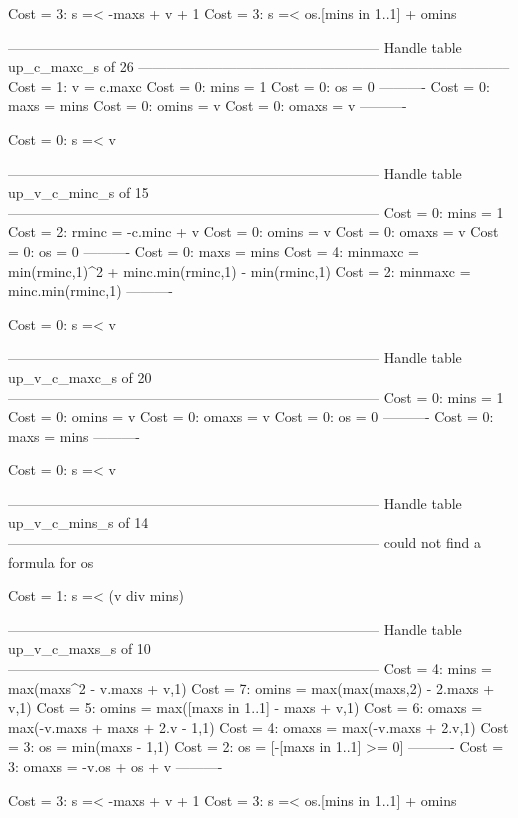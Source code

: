 Cost =  3:  s =< -maxs + v + 1
Cost =  3:  s =< os.[mins in 1..1] + omins

--------------------------------------------------------------------------------
Handle table up_c_maxc_s of 26
--------------------------------------------------------------------------------
Cost =  1:  v     = c.maxc
Cost =  0:  mins  = 1
Cost =  0:  os    = 0
----------
Cost =  0:  maxs  = mins
Cost =  0:  omins = v
Cost =  0:  omaxs = v
----------

Cost =  0:  s =< v

--------------------------------------------------------------------------------
Handle table up_v_c_minc_s of 15
--------------------------------------------------------------------------------
Cost =  0:  mins    = 1
Cost =  2:  rminc   = -c.minc + v
Cost =  0:  omins   = v
Cost =  0:  omaxs   = v
Cost =  0:  os      = 0
----------
Cost =  0:  maxs    = mins
Cost =  4:  minmaxc = min(rminc,1)^2 + minc.min(rminc,1) - min(rminc,1)
Cost =  2:  minmaxc = minc.min(rminc,1)
----------

Cost =  0:  s =< v

--------------------------------------------------------------------------------
Handle table up_v_c_maxc_s of 20
--------------------------------------------------------------------------------
Cost =  0:  mins  = 1
Cost =  0:  omins = v
Cost =  0:  omaxs = v
Cost =  0:  os    = 0
----------
Cost =  0:  maxs  = mins
----------

Cost =  0:  s =< v

--------------------------------------------------------------------------------
Handle table up_v_c_mins_s of 14
--------------------------------------------------------------------------------
could not find a formula for os

Cost =  1:  s =< (v div mins)

--------------------------------------------------------------------------------
Handle table up_v_c_maxs_s of 10
--------------------------------------------------------------------------------
Cost =  4:  mins  = max(maxs^2 - v.maxs + v,1)
Cost =  7:  omins = max(max(maxs,2) - 2.maxs + v,1)
Cost =  5:  omins = max([maxs in 1..1] - maxs + v,1)
Cost =  6:  omaxs = max(-v.maxs + maxs + 2.v - 1,1)
Cost =  4:  omaxs = max(-v.maxs + 2.v,1)
Cost =  3:  os    = min(maxs - 1,1)
Cost =  2:  os    = [-[maxs in 1..1] >= 0]
----------
Cost =  3:  omaxs = -v.os + os + v
----------

Cost =  3:  s =< -maxs + v + 1
Cost =  3:  s =< os.[mins in 1..1] + omins

